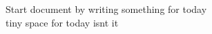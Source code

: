 \documentclass{article}
\begin{document}
Start document by writing something for today \\
tiny space for today isnt it
\end{document}
